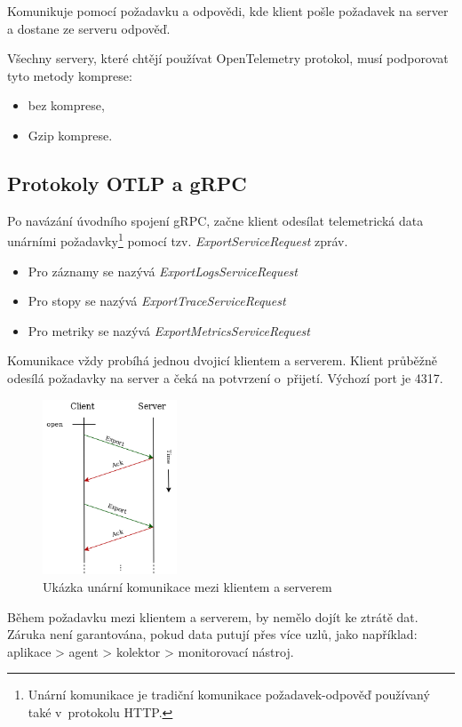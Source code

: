 Komunikuje pomocí požadavku a odpovědi, kde klient pošle požadavek na server a dostane ze serveru odpověď.

Všechny servery, které chtějí používat OpenTelemetry protokol, musí podporovat tyto metody komprese:
\begin{itemize}
    \item{bez komprese,}
    \item{Gzip komprese.}
\end{itemize}
\subsection{Protokoly OTLP a gRPC}
Po navázání úvodního spojení gRPC, začne klient odesílat telemetrická data unárními požadavky\footnote{Unární komunikace je tradiční komunikace požadavek-odpověď používaný také v~protokolu HTTP.} pomocí tzv. \textit{ExportServiceRequest} zpráv. 
\begin{itemize}
        \item{Pro záznamy se nazývá \textit{ExportLogsServiceRequest}}
        \item{Pro stopy se nazývá \textit{ExportTraceServiceRequest}}
        \item{Pro metriky se nazývá \textit{ExportMetricsServiceRequest}}
\end{itemize}
Komunikace vždy probíhá jednou dvojicí klientem a serverem. Klient průběžně odesílá požadavky na server a čeká na potvrzení o~přijetí. Výchozí port je 4317.
\begin{figure}[H]
  \centering
  \includegraphics[width=4cm]{obrazky-figures/otlp-request-response.png}
  \caption{Ukázka unární komunikace mezi klientem a serverem\protect\footnotemark}
  \label{fig:oltp}
\end{figure}
Během požadavku mezi klientem a serverem, by nemělo dojít ke ztrátě dat. Záruka není garantována, pokud data putují přes více uzlů, jako například: aplikace > agent > kolektor > monitorovací nástroj.


